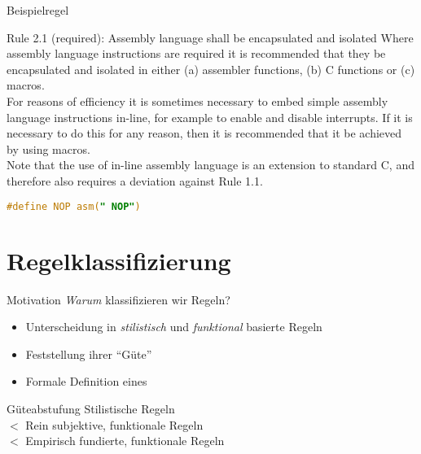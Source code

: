 \documentclass{beamer}
\begin{document}
    \begin{frame}[fragile]{Beispielregel}
        \begin{exampleblock}{Rule 2.1 (required): Assembly language shall be encapsulated and isolated}
            Where assembly language instructions are required it is recommended that they be encapsulated
            and isolated in either (a) assembler functions, (b) C functions or (c) macros.\\
            For reasons of efficiency it is sometimes necessary to embed simple assembly language instructions
            in-line, for example to enable and disable interrupts.
            If it is necessary to do this for any reason, then it is recommended that it be achieved by using macros.\\
            Note that the use of in-line assembly language is an extension to standard C, and therefore also
            requires a deviation against Rule 1.1.
            \begin{lstlisting}[language=C]
                #define NOP asm(" NOP")
            \end{lstlisting}
        \end{exampleblock}
    \end{frame}

    \section{Regelklassifizierung}
    \label{sec:regelklassifizierung}
    \begin{frame}{Motivation}
        \textit{Warum} klassifizieren wir Regeln?
        \pause
        \begin{itemize}
            \item Unterscheidung in \textit{stilistisch} und \textit{funktional} basierte Regeln
            \item Feststellung ihrer \enquote{Güte}
            \item Formale Definition eines \slss
        \end{itemize}
        \pause
        \begin{block}{Güteabstufung}
            \quad \quad Stilistische Regeln\\
            $<$ \quad Rein subjektive, funktionale Regeln\\
            $<$ \quad Empirisch fundierte, funktionale Regeln
        \end{block}
    \end{frame}
\end{document}
